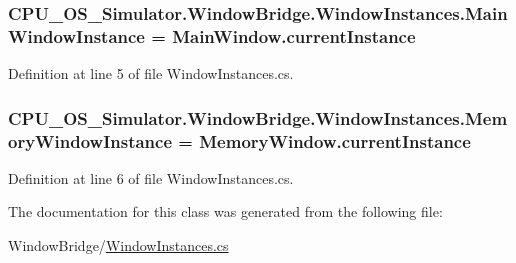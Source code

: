 \subsubsection[{Main\+Window\+Instance}]{ C\+P\+U\+\_\+\+O\+S\+\_\+\+Simulator.\+Window\+Bridge.\+Window\+Instances.\+Main\+Window\+Instance = {\bf Main\+Window.\+current\+Instance}\hspace{0.3cm}{\ttfamily [static]}}\label{class_c_p_u___o_s___simulator_1_1_window_bridge_1_1_window_instances_a130a2c32e8ccfd51a42ecb363fbb42cc}


Definition at line 5 of file Window\+Instances.\+cs.

\hypertarget{class_c_p_u___o_s___simulator_1_1_window_bridge_1_1_window_instances_a401fd485bde830472a1a960a25ec1464}{}
\subsubsection[{Memory\+Window\+Instance}]{ C\+P\+U\+\_\+\+O\+S\+\_\+\+Simulator.\+Window\+Bridge.\+Window\+Instances.\+Memory\+Window\+Instance = {\bf Memory\+Window.\+current\+Instance}\hspace{0.3cm}{\ttfamily [static]}}\label{class_c_p_u___o_s___simulator_1_1_window_bridge_1_1_window_instances_a401fd485bde830472a1a960a25ec1464}


Definition at line 6 of file Window\+Instances.\+cs.



The documentation for this class was generated from the following file\+:\begin{DoxyCompactItemize}
\item 
Window\+Bridge/\hyperlink{_window_instances_8cs}{Window\+Instances.\+cs}\end{DoxyCompactItemize}
